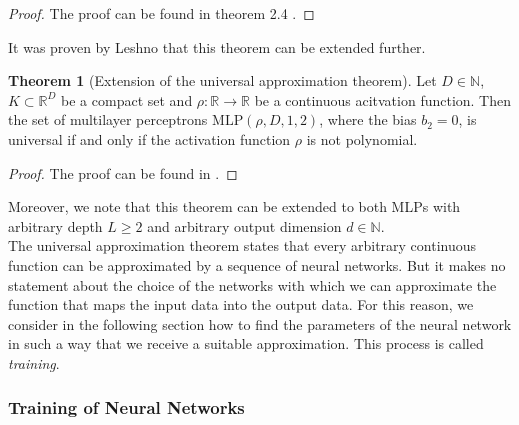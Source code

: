 \documentclass[11pt,titlepage]{article}
\newcommand{\R}{\mathbb{R}} %
\newcommand{\N}{\mathbb{N}} %
\theoremstyle{definition}
\newtheorem{theorem}{Theorem}[section]
\theoremstyle{remark}
\begin{document}
	\begin{proof}
		The proof can be found in theorem 2.4 \cite{Petersen2022}.
	\end{proof}

	It was proven by Leshno \cite{Leshno1992} that this theorem can be extended further.
	
	\begin{theorem}[Extension of the universal approximation theorem]
		Let $D\in\N$, $K\subset\R^D$ be a compact set and $\rho:\R\to\R$ be a continuous 
		acitvation function. Then the set of multilayer perceptrons $\mathrm{MLP}(\rho, D, 1, 2)$, where 
		the bias $b_2 = 0$, is universal if and only if the activation function $\rho$ 
		is not polynomial.
	\end{theorem}
	
	\begin{proof}
		The proof can be found in \cite{Leshno1992}.
	\end{proof}

	Moreover, we note that this theorem can be extended to both MLPs with arbitrary depth 
	$L\geq 2$ and arbitrary output dimension $d\in\N$. \\
	The universal approximation theorem states that every arbitrary continuous function can be approximated by a sequence of neural networks. But it makes no statement about the choice of the networks with which we can approximate the function that maps the input data into the output data. For this reason, we consider in the following section how to find the parameters of the neural network in such a way that we receive a suitable approximation. This process is called \textsl{training}.

	\subsubsection{Training of Neural Networks}\label{subsec training NNs}
	
\end{document}
